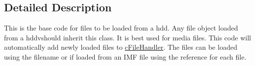 \subsection{Detailed Description}
This is the base code for files to be loaded from a hdd. Any file object loaded from a hddvshould inherit this class. It is best used for media files. This code will automatically add newly loaded files to \hyperlink{classc_file_handler}{cFileHandler}. The files can be loaded using the filename or if loaded from an IMF file using the reference for each file. 